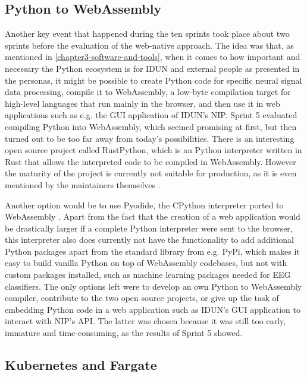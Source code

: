 \subsection{Python to WebAssembly}
\label{chapter4-python-to-webassembly}

Another key event that happened during the ten sprints took place about two sprints before the evaluation of the web-native approach. The idea was that, as mentioned in \autoref{chapter3-software-and-tools}, when it comes to how important and necessary the Python ecosystem is for IDUN and external people as presented in the personas, it might be possible to create Python code for specific neural signal data processing, compile it to WebAssembly, a low-byte compilation target for high-level languages that run mainly in the browser, and then use it in web applications such as e.g. the GUI application of IDUN's NIP. Sprint 5 evaluated compiling Python into WebAssembly, which seemed promising at first, but then turned out to be too far away from today's possibilities. There is an interesting open source project called RustPython, which is an Python interpreter written in Rust that allows the interpreted code to be compiled in WebAssembly. However the maturity of the project is currently not suitable for production, as it is even mentioned by the maintainers themselves \citep{noauthor_rustpython_2022}.

Another option would be to use Pyodide, the CPython interpreter ported to WebAssembly \citep{noauthor_pyodide_2022}. Apart from the fact that the creation of a web application would be drastically larger if a complete Python interpreter were sent to the browser, this interpreter also does currently not have the functionality to add additional Python packages apart from the standard library from e.g. PyPi, which makes it easy to build vanilla Python on top of WebAssembly codebases, but not with custom packages installed, such as machine learning packages needed for EEG classifiers. The only options left were to develop an own Python to WebAssembly compiler, contribute to the two open source projects, or give up the task of embedding Python code in a web application such as IDUN's GUI application to interact with NIP's API. The latter was chosen because it was still too early, immature and time-consuming, as the results of Sprint 5 showed.

\subsection{Kubernetes and Fargate}
\label{chapter4-kubernetes-and-aws-fargate}

